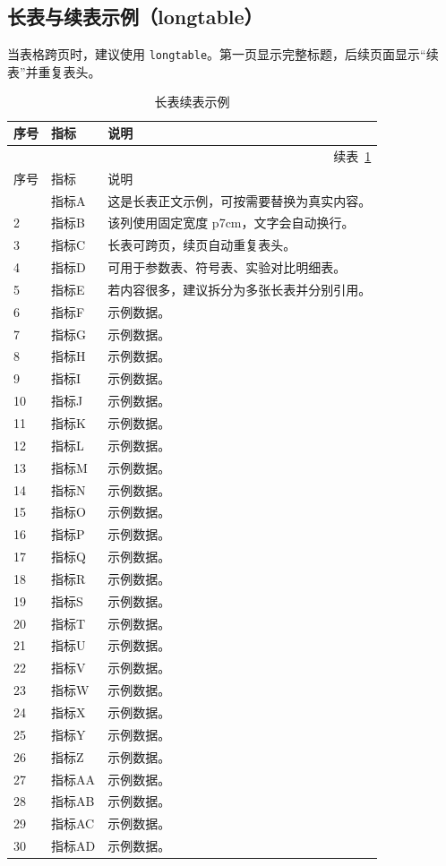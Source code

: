\subsection{长表与续表示例（longtable）}

当表格跨页时，建议使用 \verb|longtable|。第一页显示完整标题，后续页面显示“续表”并重复表头。

\begin{longtable}{p{2cm}p{3cm}p{7cm}}
  \caption{长表续表示例}\label{tab:usage-long}\\
  \toprule
  序号 & 指标 & 说明 \\
  \midrule
  \endfirsthead
  \multicolumn{3}{r}{续表~\ref{tab:usage-long}}\\
  \toprule
  序号 & 指标 & 说明 \\
  \midrule
  \endhead
  \bottomrule
  \endfoot
  \bottomrule
  \endlastfoot
  1 & 指标A & 这是长表正文示例，可按需要替换为真实内容。\\
  2 & 指标B & 该列使用固定宽度 p{7cm}，文字会自动换行。\\
  3 & 指标C & 长表可跨页，续页自动重复表头。\\
  4 & 指标D & 可用于参数表、符号表、实验对比明细表。\\
  5 & 指标E & 若内容很多，建议拆分为多张长表并分别引用。\\
  6 & 指标F & 示例数据。\\
  7 & 指标G & 示例数据。\\
  8 & 指标H & 示例数据。\\
  9 & 指标I & 示例数据。\\
  10 & 指标J & 示例数据。\\
  11 & 指标K & 示例数据。\\
  12 & 指标L & 示例数据。\\
  13 & 指标M & 示例数据。\\
  14 & 指标N & 示例数据。\\
  15 & 指标O & 示例数据。\\
  16 & 指标P & 示例数据。\\
  17 & 指标Q & 示例数据。\\
  18 & 指标R & 示例数据。\\
  19 & 指标S & 示例数据。\\
  20 & 指标T & 示例数据。\\
  21 & 指标U & 示例数据。\\
  22 & 指标V & 示例数据。\\
  23 & 指标W & 示例数据。\\
  24 & 指标X & 示例数据。\\
  25 & 指标Y & 示例数据。\\
  26 & 指标Z & 示例数据。\\
  27 & 指标AA & 示例数据。\\
  28 & 指标AB & 示例数据。\\
  29 & 指标AC & 示例数据。\\
  30 & 指标AD & 示例数据。\\
\end{longtable}


